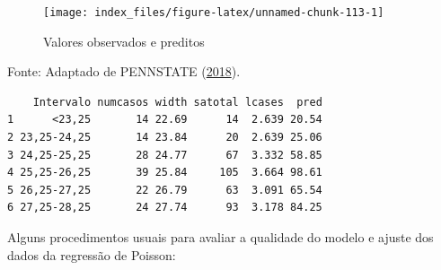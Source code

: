 \documentclass[12pt,brazil,oneside]{book}
\newenvironment{Shaded}{\begin{snugshade}}{\end{snugshade}}
\newcommand{\DataTypeTok}[1]{\textcolor[rgb]{0.13,0.29,0.53}{#1}}
\newcommand{\DecValTok}[1]{\textcolor[rgb]{0.00,0.00,0.81}{#1}}
\newcommand{\KeywordTok}[1]{\textcolor[rgb]{0.13,0.29,0.53}{\textbf{#1}}}
\newcommand{\NormalTok}[1]{#1}
\newcommand{\OperatorTok}[1]{\textcolor[rgb]{0.81,0.36,0.00}{\textbf{#1}}}
\newcommand{\StringTok}[1]{\textcolor[rgb]{0.31,0.60,0.02}{#1}}
\begin{document}
\begin{Shaded}
\end{Shaded}

\begin{figure}[H]

{\centering \texttt{[image: index\_files/figure-latex/unnamed-chunk-113-1]} 

}

\caption{Valores observados e preditos}\label{fig:unnamed-chunk-113}
\end{figure}

Fonte: Adaptado de PENNSTATE (\protect\hyperlink{ref-penn2018}{2018}).

\begin{Shaded}
\end{Shaded}

\begin{verbatim}
    Intervalo numcasos width satotal lcases  pred
1      <23,25       14 22.69      14  2.639 20.54
2 23,25-24,25       14 23.84      20  2.639 25.06
3 24,25-25,25       28 24.77      67  3.332 58.85
4 25,25-26,25       39 25.84     105  3.664 98.61
5 26,25-27,25       22 26.79      63  3.091 65.54
6 27,25-28,25       24 27.74      93  3.178 84.25
\end{verbatim}

Alguns procedimentos usuais para avaliar a qualidade do modelo e ajuste dos dados da regressão de Poisson:
\end{document}
